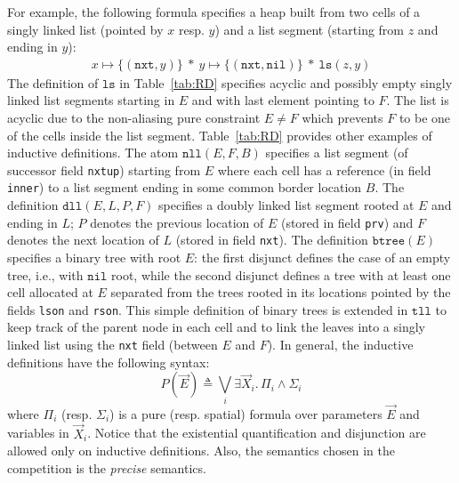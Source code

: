 \documentclass[twoside,11pt]{article}
\newcommand{\sep}{.\,}
\newcommand{\posep}{*}
\newcommand{\points}{\mapsto}
\newcommand{\nil}{\mathtt{nil}}
\newcommand{\ls}{\mathtt{ls}}
\newcommand{\dll}{\mathtt{dll}}
\newcommand{\nll}{\mathtt{nll}}
\begin{document}
For example, the following formula specifies a heap built from two cells of a singly linked list
(pointed by $x$ resp. $y$) and a list segment (starting from $z$ and ending in $y$):
\begin{align}
x \points \{(\texttt{nxt},y)\} \ \posep\ y \points \{(\texttt{nxt},\nil)\} \ \posep\ \ls(z,y)
\end{align}
The definition of $\ls$ in Table~\ref{tab:RD} specifies acyclic and possibly empty singly linked list segments starting in $E$ and with last element pointing to $F$.
The list is acyclic due to the non-aliasing pure constraint $E\neq F$ which prevents $F$ to be one of the cells inside the list segment.
%
Table~\ref{tab:RD} provides other examples of inductive definitions.
%
The atom $\nll(E,F,B)$ specifies a list segment (of successor field \texttt{nxtup}) starting from $E$ where each cell has a reference (in field \texttt{inner}) to a list segment ending in some common border location $B$. 
%
The definition $\dll(E,L,P,F)$ specifies a doubly linked list segment rooted at $E$ and ending in $L$; $P$ denotes the previous location of $E$ (stored in field \texttt{prv}) and $F$ denotes the next location of $L$  (stored in field \texttt{nxt}).
%
The definition $\mathtt{btree}(E)$ specifies a binary tree with root $E$:
the first disjunct defines the case of an empty tree, i.e., with $\nil$ root, while the second disjunct defines a tree with at least one cell allocated at $E$ separated from the trees rooted in its locations pointed by the fields \texttt{lson} and \texttt{rson}.
%
This simple definition of binary trees is extended in $\mathtt{tll}$ to keep track of the parent node in each cell and to link the leaves into a singly linked list using the \texttt{nxt} field (between $E$ and $F$).
%
In general, the inductive definitions have the following syntax:
\begin{equation}\label{eq:RD}
P(\vec{E}) \triangleq \bigvee_i \exists \vec{X}_i\sep \Pi_i \land \Sigma_i
\end{equation}
\noindent where $\Pi_i$ (resp. $\Sigma_i$) is a pure (resp. spatial) formula over parameters $\vec{E}$ and variables in $\vec{X}_i$.
Notice that the existential quantification and disjunction are allowed only on inductive definitions. 
Also, the semantics chosen in the competition is the \emph{precise} semantics.
\end{document}
